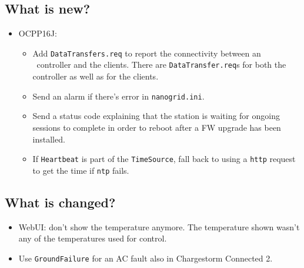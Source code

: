 \documentclass{scrartcl}
\begin{document}
\subsection*{What is new?}
\begin{itemize}
\item OCPP16J:
  \begin{itemize}
  \item Add \verb|DataTransfers.req| to report the connectivity between an
    \nanogrid\ controller and the clients. There are \verb|DataTransfer.req|s
    for both the controller as well as for the clients.
  \item Send an alarm if there's error in \verb|nanogrid.ini|.
  \item Send a status code explaining that the station is waiting for ongoing
    sessions to complete in order to reboot after a FW upgrade has been
    installed.
  \item If \verb|Heartbeat| is part of the \verb|TimeSource|, fall back to
    using a \verb|http| request to get the time if \verb|ntp| fails.
  \end{itemize}
\end{itemize}
\subsection*{What is changed?}
\begin{itemize}
\item WebUI: don't show the temperature anymore. The temperature shown wasn't
  any of the temperatures used for control.
\item Use \verb|GroundFailure| for an AC fault also in Chargestorm Connected
  2.
\end{itemize}
\end{document}
